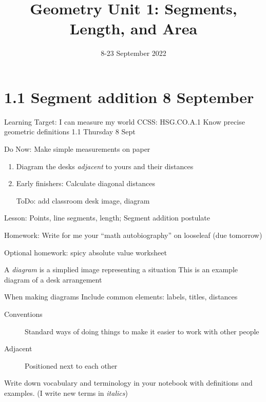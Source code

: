 

\title{Geometry Unit 1: Segments, Length, and Area}
\date{8-23 September 2022}


\frame{\titlepage}

\section[Outline]{}
\frame{\tableofcontents}

\section{1.1 Segment addition \hfill 8 September}
\begin{frame}{Learning Target: I can measure my world}
  {CCSS: HSG.CO.A.1 Know precise geometric definitions \hfill \alert{1.1 Thursday 8 Sept}}
  \begin{block}{Do Now: Make simple measurements on paper}
    \begin{enumerate}
        \item Diagram the desks \emph{adjacent} to yours and their distances
        \item Early finishers: Calculate diagonal distances
        \item [ToDo:] add classroom desk image, diagram
    \end{enumerate}
    \end{block}
    Lesson: Points, line segments, length; Segment addition postulate \par \medskip
    Homework: Write for me your ``math autobiography'' on looseleaf (due tomorrow) \par \medskip
    Optional homework: spicy absolute value worksheet
\end{frame}

\begin{frame}{A \emph{diagram} is a simplied image representing a situation}
  {This is an example diagram of a desk arrangement}
  \begin{block}{When making diagrams}
    Include common elements: labels, titles, distances \par \medskip
  \end{block}
  \begin{description}
    \item[Conventions] Standard ways of doing things to make it easier to work with other people
    \item[Adjacent] Positioned next to each other
  \end{description} \vspace{2cm}
  Write down vocabulary and terminology in your notebook with definitions and examples. (I write new terms in \emph{italics})
\end{frame}

